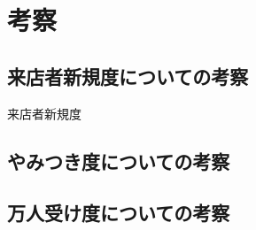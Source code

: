 \chapter{考察}

\label{chap:discussion}

\section{来店者新規度についての考察}
来店者新規度
\section{やみつき度についての考察}
\section{万人受け度についての考察}
